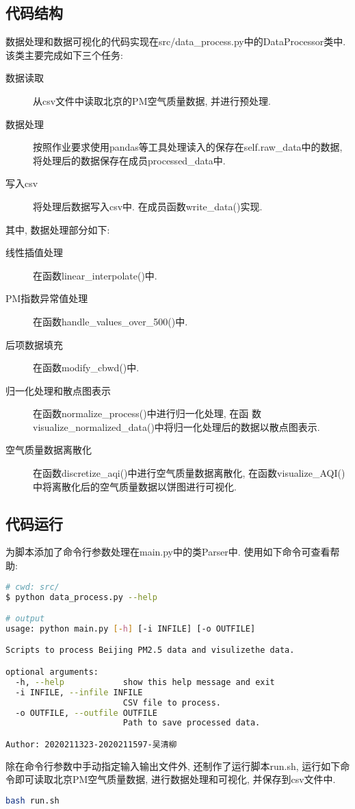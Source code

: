 \subsection{代码结构}
数据处理和数据可视化的代码实现在src/data\_process.py中的DataProcessor类中.
该类主要完成如下三个任务:
\begin{description}
    \item[数据读取] 从csv文件中读取北京的PM空气质量数据, 并进行预处理.
    \item[数据处理] 按照作业要求使用pandas等工具处理读入的保存在self.raw\_data中的数据,
        将处理后的数据保存在成员processed\_data中.
    \item[写入csv] 将处理后数据写入csv中. 在成员函数write\_data()实现.
\end{description}

其中, 数据处理部分如下:
\begin{description}
    \item[线性插值处理] 在函数linear\_interpolate()中.
    \item[PM指数异常值处理] 在函数handle\_values\_over\_500()中.
    \item[后项数据填充] 在函数modify\_cbwd()中.
    \item[归一化处理和散点图表示] 在函数normalize\_process()中进行归一化处理, 在函
        数visualize\_normalized\_data()中将归一化处理后的数据以散点图表示.
    \item[空气质量数据离散化] 在函数discretize\_aqi()中进行空气质量数据离散化,
        在函数visualize\_AQI()中将离散化后的空气质量数据以饼图进行可视化.
\end{description}

\subsection{代码运行}
为脚本添加了命令行参数处理在main.py中的类Parser中. 使用如下命令可查看帮助:
\begin{lstlisting}[language=bash]
# cwd: src/
$ python data_process.py --help

# output
usage: python main.py [-h] [-i INFILE] [-o OUTFILE]

Scripts to process Beijing PM2.5 data and visulizethe data.

optional arguments:
  -h, --help            show this help message and exit
  -i INFILE, --infile INFILE
                        CSV file to process.
  -o OUTFILE, --outfile OUTFILE
                        Path to save processed data.

Author: 2020211323-2020211597-吴清柳
\end{lstlisting}

除在命令行参数中手动指定输入输出文件外, 还制作了运行脚本run.sh,
运行如下命令即可读取北京PM空气质量数据, 进行数据处理和可视化, 并保存到csv文件中.
\begin{lstlisting}[language=bash]
bash run.sh
\end{lstlisting}
